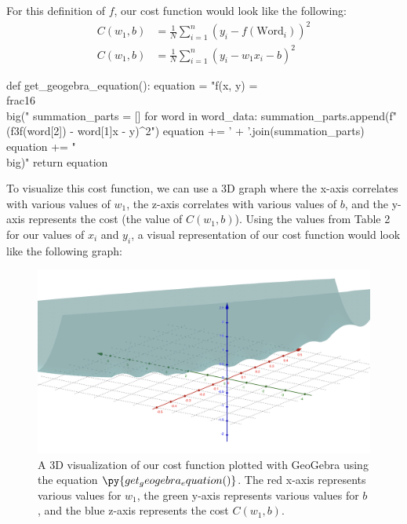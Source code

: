\documentclass[12pt]{article}
\begin{document}
For this definition of $f$, our cost function would look like the following:
\begin{align*}
	C(w_1, b) & = \frac{1}{N} \sum_{i=1}^{n} (y_i - f(\text{Word}_i))^2
	\\
	C(w_1, b) & = \frac{1}{N} \sum_{i=1}^{n} (y_i - w_1x_i - b)^2
\end{align*}

\begin{pycode}
def get_geogebra_equation():
	equation = "f(x, y) = \\frac{1}{6}\\big("
	summation_parts = []
	for word in word_data:
		summation_parts.append(f"({f3f(word[2])} - {word[1]}x - y)^2")
	equation += ' + '.join(summation_parts)
	equation += "\\big)"
	return equation

\end{pycode}

To visualize this cost function, we can use a 3D graph where the x-axis correlates with various values of $w_1$, the z-axis correlates with various values of $b$, and the y-axis represents the cost (the value of $C(w_1, b)$). Using the values from Table 2 for our values of $x_i$ and $y_i$, a visual representation of our cost function would look like the following graph:
\begin{figure}[H]
	\centering
	\caption{A 3D visualization of our cost function plotted with GeoGebra using the equation $\py{get_geogebra_equation()}$. The red x-axis represents various values for $w_1$, the green y-axis represents various values for $b$, and the blue z-axis represents the cost $C(w_1, b)$.}
	\includegraphics[width=\linewidth]{3d-plot.png}
\end{figure}
\end{document}
